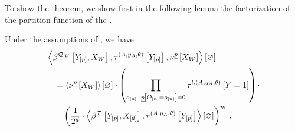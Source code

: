 To show the theorem, we show first in the following lemma the factorization of the partition function of the \HybridFOLNetwork{}.

\begin{lemma}
    \label{lem:FOLpartitionfunctionfactorization}
    Under the assumptions of , we have
    \begin{align*}
        &\left\langle 
            \beta^{{\mathcal{Q}}|_{\mathcal{U}}}\left[Y_{[p]},X_{W}\right],\tau^{(A,y_{A},\theta)}\left[Y_{[p]}\right],\nu^{\underline{p}}\left[X_{W}\right]
        \right\rangle \left[ \varnothing \right] \\
        &\quad=\left\langle \nu^{\underline{p}}\left[X_{W}\right]\right\rangle \left[ \varnothing \right] \cdot
        \left(  \prod_{o_{[n]}\,:\,\underline{p}\left[O_{[n]}=o_{[n]}\right]=0} \tau^{l,(A,y_{A},\theta)}\left[Y=1\right]\right) \cdot \\
        &\quad\quad \left(\frac{1}{2^{d}}
        \cdot \left\langle \beta^{\mathcal{F}}\left[Y_{[p]},X_{[d]}\right],\tau^{(A,y_{A},\theta)}\left[Y_{[p]}\right]\right\rangle \left[ \varnothing \right]
        \right)^{m} \, .
    \end{align*}
\end{lemma}
